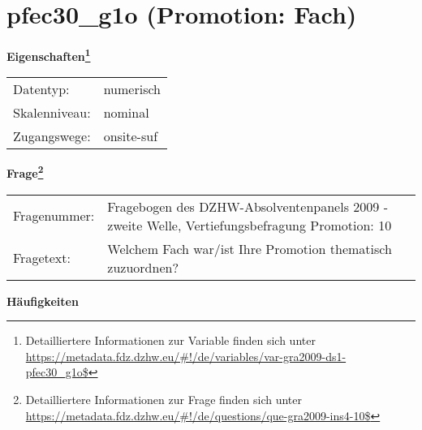 
    \setcounter{footnote}{0}

    \vspace*{-1.8cm}
	\section{pfec30\_g1o (Promotion: Fach)}
	\label{section:pfec30_g1o}



    \vspace*{0.5cm}
    \noindent\textbf{Eigenschaften\footnote{Detailliertere Informationen zur Variable finden sich unter
		\url{https://metadata.fdz.dzhw.eu/\#!/de/variables/var-gra2009-ds1-pfec30_g1o$}}}\\
	\begin{tabularx}{\hsize}{@{}lX}
	Datentyp: & numerisch \\
	Skalenniveau: & nominal \\
	Zugangswege: &
	  onsite-suf
 \\
    \end{tabularx}



				\vspace*{0.5cm}
                \noindent\textbf{Frage\footnote{Detailliertere Informationen zur Frage finden sich unter
		              \url{https://metadata.fdz.dzhw.eu/\#!/de/questions/que-gra2009-ins4-10$}}}\\
				\begin{tabularx}{\hsize}{@{}lX}
					Fragenummer: &
					  Fragebogen des DZHW-Absolventenpanels 2009 - zweite Welle, Vertiefungsbefragung Promotion:
					  10
 \\
					Fragetext: & Welchem Fach war/ist Ihre Promotion thematisch zuzuordnen? \\
				\end{tabularx}





        		\vspace*{0.5cm}
                \noindent\textbf{Häufigkeiten}

